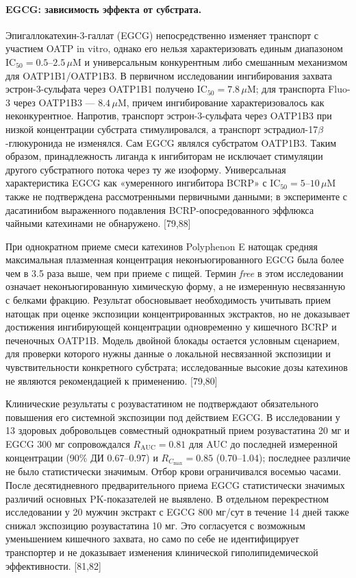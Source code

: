 \documentclass[11pt]{article}
\begin{document}
\paragraph{EGCG: зависимость эффекта от субстрата.}
Эпи\-галло\-катехин-3-галлат (EGCG) непосредственно изменяет транспорт с участием OATP in vitro, однако его нельзя характеризовать единым диапазоном \(\mathrm{IC}_{50}=0.5\)--\(2.5\,\mu\mathrm{M}\) и универсальным конкурентным либо смешанным механизмом для OATP1B1/OATP1B3. В первичном исследовании ингибирования захвата эстрон-3-сульфата через OATP1B1 получено \(\mathrm{IC}_{50}=7.8\,\mu\mathrm{M}\); для транспорта Fluo-3 через OATP1B3 --- \(8.4\,\mu\mathrm{M}\), причем ингибирование характеризовалось как неконкурентное. Напротив, транспорт эстрон-3-сульфата через OATP1B3 при низкой концентрации субстрата стимулировался, а транспорт эстрадиол-17\(\beta\)-глюкуронида не изменялся. Сам EGCG являлся субстратом OATP1B3. Таким образом, принадлежность лиганда к ингибиторам не исключает стимуляции другого субстратного потока через ту же изоформу. Универсальная характеристика EGCG как «умеренного ингибитора BCRP» с \(\mathrm{IC}_{50}=5\)--\(10\,\mu\mathrm{M}\) также не подтверждена рассмотренными первичными данными; в эксперименте с дасатинибом выраженного подавления BCRP-опосредованного эффлюкса чайными катехинами не обнаружено. [79,88]

При однократном приеме смеси катехинов Polyphenon E натощак средняя максимальная плазменная концентрация неконъюгированного EGCG была более чем в 3.5 раза выше, чем при приеме с пищей. Термин \textit{free} в этом исследовании означает неконъюгированную химическую форму, а не измеренную несвязанную с белками фракцию. Результат обосновывает необходимость учитывать прием натощак при оценке экспозиции концентрированных экстрактов, но не доказывает достижения ингибирующей концентрации одновременно у кишечного BCRP и печеночных OATP1B. Модель двойной блокады остается условным сценарием, для проверки которого нужны данные о локальной несвязанной экспозиции и чувствительности конкретного субстрата; исследованные высокие дозы катехинов не являются рекомендацией к применению. [79,80]

Клинические результаты с розувастатином не подтверждают обязательного повышения его системной экспозиции под действием EGCG. В исследовании у 13 здоровых добровольцев совместный однократный прием розувастатина 20 мг и EGCG 300 мг сопровождался \(R_{\mathrm{AUC}}=0.81\) для AUC до последней измеренной концентрации (90\% ДИ 0.67--0.97) и \(R_{C_{\max}}=0.85\) (0.70--1.04); последнее различие не было статистически значимым. Отбор крови ограничивался восемью часами. После десятидневного предварительного приема EGCG статистически значимых различий основных PK-показателей не выявлено. В отдельном перекрестном исследовании у 20 мужчин экстракт с EGCG 800 мг/сут в течение 14 дней также снижал экспозицию розувастатина 10 мг. Это согласуется с возможным уменьшением кишечного захвата, но само по себе не идентифицирует транспортер и не доказывает изменения клинической гиполипидемической эффективности. [81,82]
\end{document}
